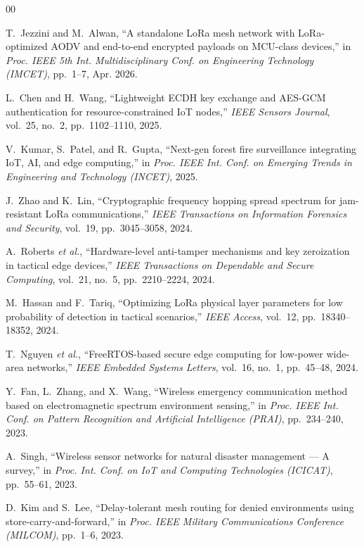 \documentclass[conference]{IEEEtran}
\begin{document}
\begin{thebibliography}{00}
\footnotesize
\setlength{\itemsep}{0pt}
\setlength{\parskip}{0pt}

T.~Jezzini and M.~Alwan, ``A standalone LoRa mesh network with LoRa-optimized AODV and end-to-end encrypted payloads on MCU-class devices,'' in \emph{Proc. IEEE 5th Int. Multidisciplinary Conf. on Engineering Technology (IMCET)}, pp.~1--7, Apr. 2026.

L.~Chen and H.~Wang, ``Lightweight ECDH key exchange and AES-GCM authentication for resource-constrained IoT nodes,'' \emph{IEEE Sensors Journal}, vol.~25, no.~2, pp.~1102--1110, 2025.

V.~Kumar, S.~Patel, and R.~Gupta, ``Next-gen forest fire surveillance integrating IoT, AI, and edge computing,'' in \emph{Proc. IEEE Int. Conf. on Emerging Trends in Engineering and Technology (INCET)}, 2025.

J.~Zhao and K.~Lin, ``Cryptographic frequency hopping spread spectrum for jam-resistant LoRa communications,'' \emph{IEEE Transactions on Information Forensics and Security}, vol.~19, pp.~3045--3058, 2024.

A.~Roberts \emph{et al.}, ``Hardware-level anti-tamper mechanisms and key zeroization in tactical edge devices,'' \emph{IEEE Transactions on Dependable and Secure Computing}, vol.~21, no.~5, pp.~2210--2224, 2024.

M.~Hassan and F.~Tariq, ``Optimizing LoRa physical layer parameters for low probability of detection in tactical scenarios,'' \emph{IEEE Access}, vol.~12, pp.~18340--18352, 2024.

T.~Nguyen \emph{et al.}, ``FreeRTOS-based secure edge computing for low-power wide-area networks,'' \emph{IEEE Embedded Systems Letters}, vol.~16, no.~1, pp.~45--48, 2024.

Y.~Fan, L.~Zhang, and X.~Wang, ``Wireless emergency communication method based on electromagnetic spectrum environment sensing,'' in \emph{Proc. IEEE Int. Conf. on Pattern Recognition and Artificial Intelligence (PRAI)}, pp.~234--240, 2023.

A.~Singh, ``Wireless sensor networks for natural disaster management --- A survey,'' in \emph{Proc. Int. Conf. on IoT and Computing Technologies (ICICAT)}, pp.~55--61, 2023.

D.~Kim and S.~Lee, ``Delay-tolerant mesh routing for denied environments using store-carry-and-forward,'' in \emph{Proc. IEEE Military Communications Conference (MILCOM)}, pp.~1--6, 2023.


\end{thebibliography}
\end{document}
